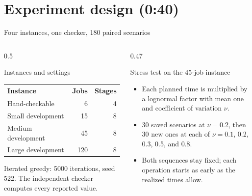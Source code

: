 \documentclass[aspectratio=169,11pt]{beamer}
\begin{document}
\section{Experiment design (0:40)}\label{sec:design}
\begin{frame}{Four instances, one checker, 180 paired scenarios}
\begin{columns}[T,onlytextwidth]
\begin{column}{0.5\textwidth}
\begin{block}{Instances and settings}
\footnotesize
\begin{tabular}{lrr}
\toprule
Instance & Jobs & Stages \\
\midrule
Hand-checkable & 6 & 4 \\
Small development & 15 & 8 \\
Medium development & 45 & 8 \\
Large development & 120 & 8 \\
\bottomrule
\end{tabular}
\par\medskip
Iterated greedy: 5000 iterations, seed 522. The independent checker computes every reported value.
\end{block}
\end{column}
\begin{column}{0.47\textwidth}
\begin{block}{Stress test on the 45-job instance}
\footnotesize
\begin{itemize}
\item Each planned time is multiplied by a lognormal factor with mean one and coefficient of variation $\nu$.
\item 30 saved scenarios at $\nu = 0.2$, then 30 new ones at each of $\nu = 0.1$, 0.2, 0.3, 0.5, and 0.8.
\item Both sequences stay fixed; each operation starts as early as the realized times allow.
\end{itemize}
\end{block}
\end{column}
\end{columns}
\end{frame}
\end{document}
